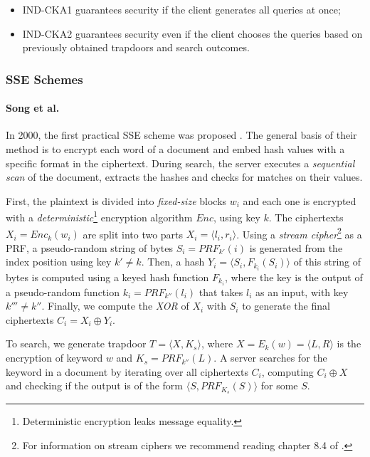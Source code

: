 \begin{itemize}
    \item \gls{IND-CKA1} guarantees security if the client generates all queries at once;
    \item \gls{IND-CKA2} guarantees security even if the client  chooses the queries based on previously obtained trapdoors and search outcomes.
\end{itemize}

\subsubsection{\gls{SSE} Schemes}

\paragraph{Song et al.} In 2000, the first practical \gls{SSE} scheme was proposed \autocite{Song2000-ir}. The general basis of their method is to encrypt each word of a document and embed hash values with a specific format in the ciphertext. During search, the server executes a \emph{sequential scan} of the document, extracts the hashes and checks for matches on their values. 

First, the plaintext is divided into \emph{fixed-size} blocks $w_i$ and each one is encrypted with a \emph{deterministic}\footnote{Deterministic encryption leaks  message  equality.} encryption algorithm $Enc$, using key $k$. The ciphertexts $X_{i} = Enc_{k}(w_{i})$ are split into two parts $X_{i}=\langle l_{i},r_{i}\rangle$. Using a \emph{stream cipher}\footnote{For information on stream ciphers we recommend reading chapter 8.4 of \autocite{Pearson2017-ve}.} as a \gls{PRF}, a pseudo-random string of bytes $S_{i}=PRF_{k'}(i)$ is generated from the index position using key $k' \neq k$. Then, a hash $Y_{i} = \langle S_{i},F_{k_{i}}(S_{i})\rangle$ of this string of bytes is computed using a keyed hash function $F_{k_{i}}$, where the key is the output of a pseudo-random function $k_{i}=PRF_{k''}(l_{i})$ that takes $l_{i}$ as an input, with key $k''' \neq k''$. Finally, we compute the \emph{XOR} of $X_{i}$ with $S_{i}$ to generate the final ciphertexts $C_{i} = X_{i} \oplus Y_{i}$.

To search, we generate trapdoor $T = \langle X, K_{s} \rangle$, where $X = E_{k}(w) = \langle L, R \rangle$ is the encryption of keyword $w$ and $K_{s}=PRF_{k''}(L)$. A server searches for the keyword in a document by iterating over all ciphertexts $C_{i}$, computing $C_{i} \oplus X$ and checking if the output is of the form $\langle S, PRF_{K_{s}}(S) \rangle$ for some $S$.

